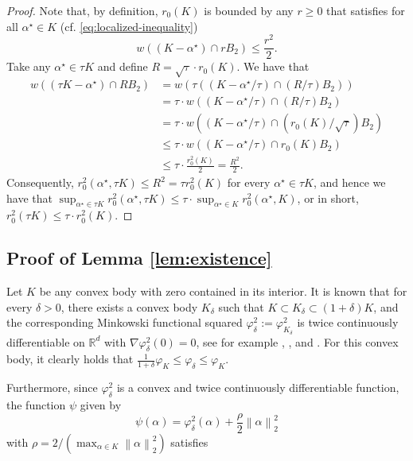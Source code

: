 \documentclass[a4paper]{article}
\newcommand{\pr}[1]{\left(#1\right)}
\newcommand{\norm}[1]{\left\|#1\right\|}
\newcommand{\RR}[0]{\mathbb{R}}
\newcommand{\alphastar}{\alpha^\star}
\newcommand{\rzero}[0]{r_{0}}
\theoremstyle{thmstyle}
\theoremstyle{defstyle}
\theoremstyle{remark}
\begin{document}
\begin{proof}
    Note that, by definition, $\rzero(K)$ is bounded by any $r\geq 0$ that satisfies for all $\alphastar \in K$ (cf. \eqref{eq:localized-inequality})
\begin{equation*}
     w\pr{(K-\alphastar)\cap rB_2}\leq \frac{r^2}{2}.
\end{equation*}
Take any $\alphastar \in \tau K$ and define $R = \sqrt{\tau} \cdot \rzero(K)$. We have that
\begin{align*}
    w\pr{(\tau K-\alphastar)\cap RB_2} &= w\pr{\tau \pr{( K-\alphastar/\tau)\cap (R/\tau) B_2}}\\
    &=\tau \cdot w\pr{( K-\alphastar/\tau)\cap (R/\tau) B_2} \\
    &= \tau \cdot w\pr{( K-\alphastar/\tau)\cap (\rzero(K)/\sqrt{\tau}) B_2} \\
    &\leq \tau \cdot w\pr{( K-\alphastar/\tau)\cap \rzero(K) B_2} \\
    &\leq \tau \cdot \frac{\rzero^2(K)}{2} = \frac{R^2}{2}.
\end{align*}
Consequently, $\rzero^2(\alphastar,\tau K)\leq R^2 = \tau \rzero^2(K)$ for every $\alphastar\in \tau K$, and hence we have that $\sup_{\alphastar \in \tau K}\rzero^2(\alphastar, \tau K)\leq \tau \cdot \sup_{\alphastar \in K}\rzero^2(\alphastar, K)$, or in short, $\rzero^2(\tau K) \leq \tau \cdot \rzero^2(K)$.
\end{proof}


\subsection{Proof of Lemma \ref{lem:existence}}
\label{subsec:proof-existence}

    Let $K$ be any convex body with zero contained in its interior. It is known that for every $\delta>0$, there exists a convex body $K_\delta$ such that $K\subset K_\delta\subset (1+\delta)K$, and the corresponding Minkowski functional squared $\varphi_\delta^2 := \varphi_{K_\delta}^2$ is twice continuously differentiable on $\RR^d$ with $\nabla \varphi_\delta^2 (0)=0$,
    see for example \cite[Section 27]{Bonnesen_1934}, \cite{Schneider2013convex}, \cite[Chapter 13]{Guirao2022renormings} and \cite[Chapter 7, \S 9]{Hajek2014smooth}. For this convex body, it clearly holds that $\frac{1}{1+\delta}\varphi_K\leq \varphi_\delta\leq \varphi_K$.

    Furthermore, since $\varphi_\delta^2$ is a convex and twice continuously differentiable function, the function $\psi$ given by
    \begin{equation*}
        \psi(\alpha)=\varphi_\delta^2(\alpha)+\frac{\rho}{2}\norm{\alpha}_2^2
    \end{equation*}
    with $\rho = 2/(\max_{\alpha\in K}\norm{\alpha}_2^2)$
    satisfies
\end{document}

